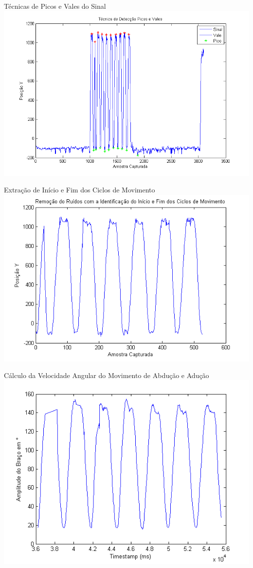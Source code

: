 \documentclass{beamer}
\begin{document}
\begin{frame}{Técnicas de Picos e Vales do Sinal}
      \center \includegraphics[height=3 in]{img/deteccaopicosvales.png}
\end{frame}

\begin{frame}{Extração de Início e Fim dos Ciclos de Movimento}
      \center \includegraphics[height=3 in]{img/remocaoruidociclo.png}
\end{frame}




\begin{frame}{Cálculo da Velocidade Angular do Movimento de Abdução e Adução}
      \center \includegraphics[height=2.8 in]{img/amplitude-braco.png}
\end{frame}
\end{document}
